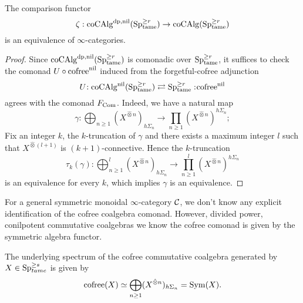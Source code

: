 \begin{proposition}
\label{all coalgebras are equivalent}
	The comparison functor
\[
\zeta: 
\operatorname{coCAlg}^{\operatorname{dp},\operatorname{nil}}(\operatorname{Sp}^{\geq r}_{\operatorname{\operatorname{tame}}}) \to
\operatorname{coCAlg}(\operatorname{Sp}^{\geq r}_{\operatorname{\operatorname{tame}}})
\]
is an equivalence of $\infty$-categories.
\end{proposition}
\begin{proof}
	Since $\operatorname{coCAlg}^{\operatorname{dp},\operatorname{nil}}(\operatorname{Sp}^{\geq r}_{\operatorname{\operatorname{tame}}})$ is comonadic over $\operatorname{Sp}^{\geq r}_{\operatorname{\operatorname{tame}}}$, it suffices to check the comonad $U\circ \operatorname{cofree}^{\operatorname{nil}}$ induced from the forgetful-cofree adjunction
	$$
	U\negmedspace: \operatorname{coCAlg}^{\operatorname{nil}}(\operatorname{Sp}^{\geq r}_{\operatorname{\operatorname{tame}}})\rightleftarrows \operatorname{Sp}^{\geq r}_{\operatorname{\operatorname{tame}}}:\negmedspace \operatorname{cofree}^{\operatorname{nil}}
	$$
	agrees with the comonad $F_{\operatorname{Com}}$. Indeed, we have a natural map
	$$
	\gamma: \bigoplus_{n\geq 1} (X^{\hat{\otimes}n})_{h\Sigma_n}
	\to 
	\prod_{n\geq 1} (X^{\hat{\otimes}n})^{h\Sigma_n};
	$$
	Fix an integer $k$, the $k$-truncation of $\gamma$ and there exists a maximum integer $l$ such that $X^{\hat{\otimes}(l+1)}$ is $(k+1)$-connective.
	Hence the $k$-truncation
	$$
	\tau_k (\gamma): \bigoplus_{n\geq 1}^l (X^{\hat{\otimes}n})_{h\Sigma_n}
	\to 
	\prod_{n\geq 1}^l (X^{\hat{\otimes}n})^{h\Sigma_n}
	$$
	 is an equivalence for every $k$, which implies $\gamma$ is an equivalence.
	\end{proof}
	
For a general symmetric monoidal $\infty$-category ${\mathcal{C}}$, we don't know any explicit identification of the cofree coalgebra comonad. However, divided power, conilpotent commutative coalgebras we know the cofree comonad is given by the symmetric algebra functor.
\begin{corollary}
	The underlying spectrum of the cofree commutative coalgebra generated by $X\in \operatorname{Sp}^{\geq s}_{tame}$ is given by
	 $$
	 \operatorname{cofree}(X) \simeq \bigoplus_{n\geq 1} (X^{\hat{\otimes}n})_{h\Sigma_n}= \operatorname{Sym}(X) .
	 $$
\end{corollary}

